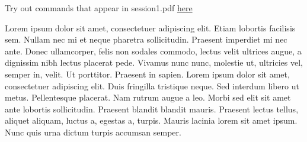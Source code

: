 \documentclass[a4paper,12pt]{article} %
\begin{document}
	
Try out commands that appear in session1.pdf \href{}{here}
	

Lorem ipsum dolor sit amet, consectetuer adipiscing elit. Etiam lobortis facilisis sem. Nullam nec mi et neque pharetra sollicitudin. Praesent imperdiet mi nec ante. Donec ullamcorper, felis non sodales commodo, lectus velit ultrices augue, a dignissim nibh lectus placerat pede. Vivamus nunc nunc, molestie ut, ultricies vel, semper in, velit. Ut porttitor. Praesent in sapien. Lorem ipsum dolor sit amet, consectetuer adipiscing elit. Duis fringilla tristique neque. Sed interdum libero ut metus. Pellentesque placerat. Nam rutrum augue a leo. Morbi sed elit sit amet ante lobortis sollicitudin. Praesent blandit blandit mauris. Praesent lectus tellus, aliquet aliquam, luctus a, egestas a, turpis. Mauris lacinia lorem sit amet ipsum. Nunc quis urna dictum turpis accumsan semper.
\end{document}
